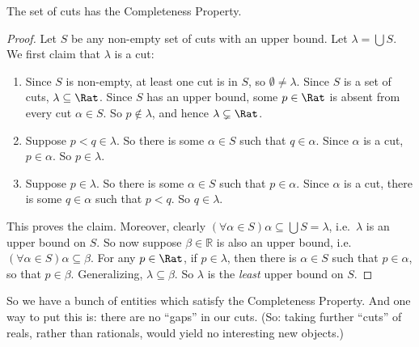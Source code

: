 \documentclass[../../../include/open-logic-section]{subfiles}
\begin{document}
\begin{thm}
The set of cuts has the Completeness Property. 
\end{thm}

\begin{proof}
Let $S$ be any non-empty set of cuts with an upper bound. Let $\lambda
= \bigcup S$. 
We first claim that $\lambda$ is a cut:
\begin{enumerate}
\item Since $S$ is non-empty, at least one cut is in $S$, so
$\emptyset \neq \lambda$. Since $S$ is a set of cuts, $\lambda
\subseteq \Rat$. Since $S$ has an upper bound, some $p \in \Rat$ is
absent from every cut $\alpha \in S$. So $p\notin \lambda$, and hence
$\lambda \subsetneq \Rat$.
\item Suppose $p < q \in \lambda$. So there is some $\alpha \in S$
such that $q \in \alpha$. Since $\alpha$ is a cut, $p \in \alpha$. So
$p \in \lambda$.
\item Suppose $p \in \lambda$. So there is some $\alpha \in S$ such
that $p \in \alpha$. Since $\alpha$ is a cut, there is some $q \in
\alpha$ such that $p < q$. So $q \in \lambda$. 
\end{enumerate}
This proves the claim. Moreover, clearly $(\forall \alpha \in S)\alpha
\subseteq \bigcup S = \lambda$, i.e.\ $\lambda$ is an upper bound on $S$. So now suppose $\beta \in \mathbb{R}$ is also an upper bound, i.e.\ $(\forall \alpha \in S)\alpha \subseteq \beta$. For any $p \in \Rat$, if $p \in \lambda$, then there is $\alpha \in S$ such that $p \in \alpha$, so that $p \in \beta$. Generalizing, $\lambda \subseteq \beta$. So $\lambda$ is the \emph{least} upper bound on $S$.
\end{proof}

So we have a bunch of entities which satisfy the Completeness
Property. And one way to put this is: there are no ``gaps'' in our
cuts. (So: taking further ``cuts'' of reals, rather than rationals,
would yield no interesting new objects.)
\end{document}
